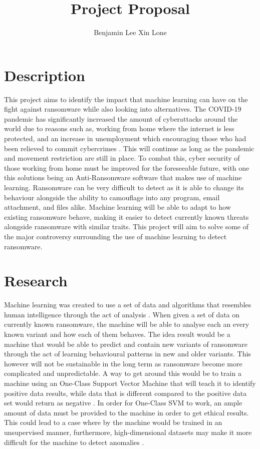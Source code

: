 \documentclass[progress]{cmpreport}
\title{Project Proposal}
\author{Benjamin Lee Xin Lone}
\begin{document}
	
	\section{Description}
		This project aims to identify the impact that machine learning can have on the fight against ransomware while also looking into alternatives. The COVID-19 pandemic has significantly increased the amount of cyberattacks around the world due to reasons such as, working from home where the internet is less protected, and an increase in unemployment which encouraging those who had been relieved to commit cybercrimes \citep{BEAMAN2021102490}. This will continue as long as the pandemic and movement restriction are still in place. To combat this, cyber security of those working from home must be improved for the foreseeable future, with one this solutions being an Anti-Ransomware software that makes use of machine learning. Ransomware can be very difficult to detect as it is able to change its behaviour alongside the ability to camouflage into any program, email attachment, and files alike. Machine learning will be able to adapt to how existing ransomware behave, making it easier to detect currently known threats alongside ransomware with similar traits. This project will aim to solve some of the major controversy surrounding the use of machine learning to detect ransomware.
			
	\section{Research}
		Machine learning was created to use a set of data and algorithms that resembles human intelligence through the act of analysis \citep{elnaqa_murphy_2015}. When given a set of data on currently known ransomware, the machine will be able to analyse each an every known variant and how each of them behaves. The idea result would be a machine that would be able to predict and contain new variants of ransomware through the act of learning behavioural patterns in new and older variants. This however will not be sustainable in the long term as ransomware become more complicated and unpredictable. A way to get around this would be to train a machine using an One-Class Support Vector Machine that will teach it to identify positive data results, while data that is different compared to the positive data set would return as negative \citep{6298824}. In order for One-Class SVM to work, an ample amount of data must be provided to the machine in order to get ethical results. This could lead to a case where by the machine would be trained in an unsupervised manner, furthermore, high-dimensional datasets may make it more difficult for the machine to detect anomalies \citep{ERFANI2016121}.
	
\end{document}
